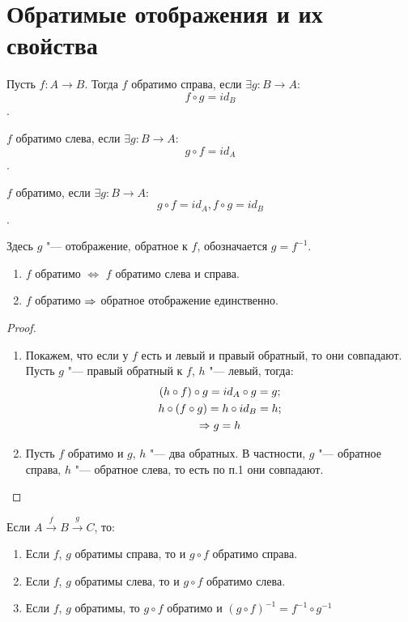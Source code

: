 ﻿\section{Обратимые отображения и их свойства}

\begin{Def}
Пусть $f: A \to B$. Тогда $f$ обратимо справа, если $\exists g: B \to A \colon$ \[f \circ g = id_B\].

$f$ обратимо слева, если $\exists g: B \to A \colon$ \[g \circ f = id_A\].

$f$ обратимо, если $\exists g: B \to A \colon$ \[g \circ f = id_A, f \circ g = id_B\].

Здесь $g$ "--- отображение, обратное к $f$, обозначается $g=f^{-1}$.
\end{Def}

\begin{theorem}{}

\begin{enumerate}
\item $f$ обратимо $\iff$ $f$ обратимо слева и справа.
\item $f$ обратимо $\Rightarrow$ обратное отображение единственно.
\end{enumerate}

\end{theorem}

\begin{proof}
\begin{enumerate}
\item
Покажем, что если у $f$ есть и левый и правый обратный, то они совпадают.
Пусть $g$ "--- правый обратный к $f$, $h$ "--- левый, тогда:
\begin{gather*}
(h \circ f) \circ g = id_A \circ g = g; \\
h \circ (f \circ g) = h \circ id_B = h; \\
\Rightarrow g = h\\
\end{gather*}

\item Пусть $f$ обратимо и $g$, $h$ "--- два обратных. В частности, $g$ "--- обратное справа, $h$ "--- обратное слева, то есть по п.1 они совпадают.
\end{enumerate}
\end{proof}

\begin{theorem}{}
Если $A \xrightarrow{f} B \xrightarrow{g} C$, то:

\begin{enumerate}
\item Если $f$, $g$ обратимы справа, то и $g \circ f$ обратимо справа.
\item Если $f$, $g$ обратимы слева, то и $g \circ f$ обратимо слева.
\item Если $f$, $g$ обратимы, то $g \circ f$ обратимо и $(g \circ f)^{-1} = f^{-1} \circ g^{-1}$
\end{enumerate}
\end{theorem}

